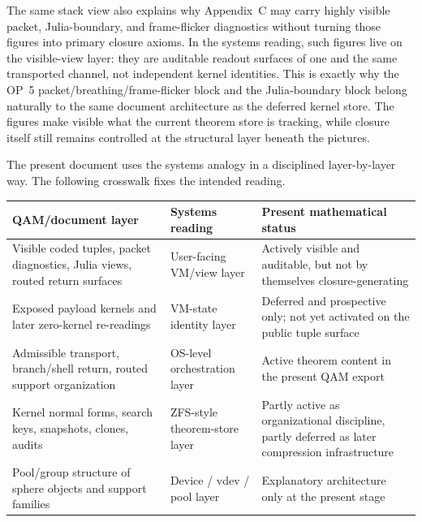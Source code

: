 \begin{remark}\label{rem:qam-vm-os-visuals}
The same stack view also explains why Appendix~C may carry highly visible packet, Julia-boundary, and frame-flicker diagnostics without turning those figures into primary closure axioms. In the systems reading, such figures live on the visible-view layer: they are auditable readout surfaces of one and the same transported channel, not independent kernel identities. This is exactly why the OP~5 packet/breathing/frame-flicker block and the Julia-boundary block belong naturally to the same document architecture as the deferred kernel store. The figures make visible what the current theorem store is tracking, while closure itself still remains controlled at the structural layer beneath the pictures.
\end{remark}


\begin{remark}\label{rem:qam-vm-os-crosswalk}
The present document uses the systems analogy in a disciplined layer-by-layer way. The following crosswalk fixes the intended reading.
\begin{center}
\renewcommand{\arraystretch}{1.12}
\begin{tabular}{|P{0.29\textwidth}|P{0.28\textwidth}|P{0.31\textwidth}|}
\hline
\textbf{QAM/document layer} & \textbf{Systems reading} & \textbf{Present mathematical status} \\
\hline
Visible coded tuples, packet diagnostics, Julia views, routed return surfaces & User-facing VM/view layer & Actively visible and auditable, but not by themselves closure-generating \\
\hline
Exposed payload kernels and later zero-kernel re-readings & VM-state identity layer & Deferred and prospective only; not yet activated on the public tuple surface \\
\hline
Admissible transport, branch/shell return, routed support organization & OS-level orchestration layer & Active theorem content in the present QAM export \\
\hline
Kernel normal forms, search keys, snapshots, clones, audits & ZFS-style theorem-store layer & Partly active as organizational discipline, partly deferred as later compression infrastructure \\
\hline
Pool/group structure of sphere objects and support families & Device / vdev / pool layer & Explanatory architecture only at the present stage \\
\hline
\end{tabular}
\end{center}
\end{remark}

